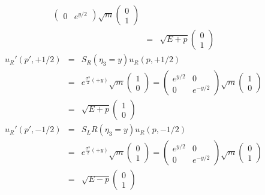 \documentclass[11pt]{article}
\begin{document}
\begin{itemize}
\begin{eqnarray}
\begin{pmatrix}
            0 & e^{y/2}
        \end{pmatrix}
        \sqrt{m}
        \begin{pmatrix}
            0\\1
        \end{pmatrix}\\
        &=&\sqrt{E+p}   
        \begin{pmatrix}
          0\\1
        \end{pmatrix}
    \end{eqnarray}
    \begin{eqnarray}
        u_R'(p',+1/2)
        &=& S_R(\eta_3=y) u_R(p,+1/2) \\
        &=& e^{ \frac{\sigma^3}{2} (+y) } \sqrt{m}
        \begin{pmatrix}
            1\\0
        \end{pmatrix}
        =
        \begin{pmatrix}
            e^{y/2} & 0\\
            0 & e^{-y/2}
        \end{pmatrix}
        \sqrt{m}
        \begin{pmatrix}
            1\\0
        \end{pmatrix}\\
        &=&\sqrt{E+p}   
        \begin{pmatrix}
          1\\0
        \end{pmatrix}\\
        u_R'(p',-1/2)
        &=& S_LR(\eta_3=y) u_R(p,-1/2) \\
        &=& e^{ \frac{\sigma^3}{2} (+y) } \sqrt{m}
        \begin{pmatrix}
            0\\1
        \end{pmatrix}
        =
        \begin{pmatrix}
            e^{y/2} & 0\\
            0 & e^{-y/2}
        \end{pmatrix}
        \sqrt{m}
        \begin{pmatrix}
            0\\1
        \end{pmatrix}\\
        &=&\sqrt{E-p}   
        \begin{pmatrix}
          0\\1
        \end{pmatrix}
    \end{eqnarray}
\end{itemize}
\end{document}
